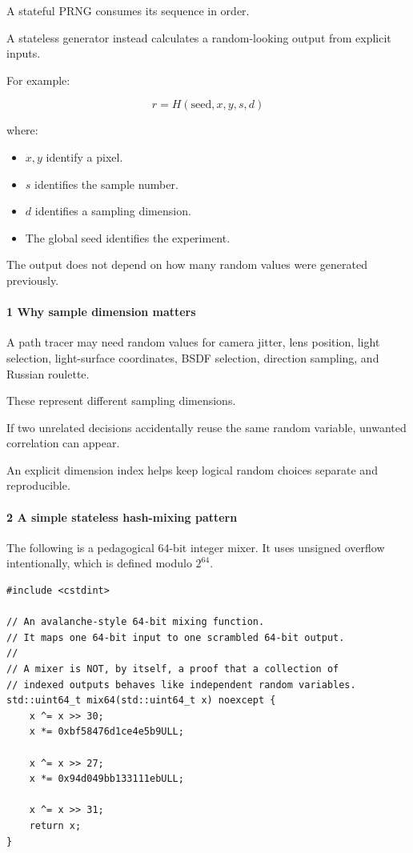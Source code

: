 A stateful PRNG consumes its sequence in order.

A stateless generator instead calculates a random-looking output from explicit inputs.

For example:

\[
 \boxed{ r=H(\text{seed},x,y,s,d) }
\]

where:

\begin{itemize}
\tightlist
\item
  \(x,y\) identify a pixel.
\item
  \(s\) identifies the sample number.
\item
  \(d\) identifies a sampling dimension.
\item
  The global seed identifies the experiment.
\end{itemize}

The output does not depend on how many random values were generated previously.

\paragraph{1 Why sample dimension matters}\label{why-sample-dimension-matters}

A path tracer may need random values for camera jitter, lens position, light selection, light-surface coordinates, BSDF selection, direction sampling, and Russian roulette.

These represent different sampling dimensions.

If two unrelated decisions accidentally reuse the same random variable, unwanted correlation can appear.

An explicit dimension index helps keep logical random choices separate and reproducible.

\paragraph{2 A simple stateless hash-mixing pattern}\label{a-simple-stateless-hash-mixing-pattern}

The following is a pedagogical 64-bit integer mixer. It uses unsigned overflow intentionally, which is defined modulo \(2^{64}\).

\begin{verbatim}
#include <cstdint>

// An avalanche-style 64-bit mixing function.
// It maps one 64-bit input to one scrambled 64-bit output.
//
// A mixer is NOT, by itself, a proof that a collection of
// indexed outputs behaves like independent random variables.
std::uint64_t mix64(std::uint64_t x) noexcept {
    x ^= x >> 30;
    x *= 0xbf58476d1ce4e5b9ULL;

    x ^= x >> 27;
    x *= 0x94d049bb133111ebULL;

    x ^= x >> 31;
    return x;
}
\end{verbatim}

